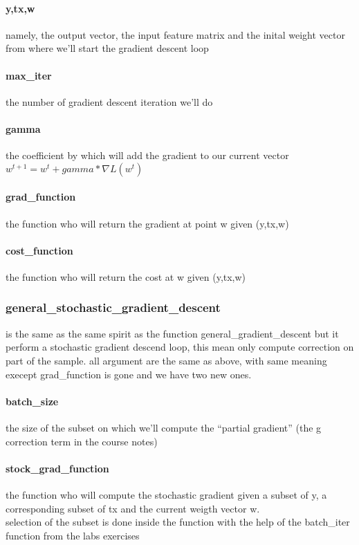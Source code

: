 \documentclass[10pt,conference,compsocconf]{IEEEtran}
\begin{document}
\paragraph{y,tx,w} namely, the output vector, the input feature matrix and
the inital weight vector from where we'll start the gradient descent
loop
\paragraph{max\_iter} the number of gradient descent iteration we'll do
\paragraph{gamma} the coefficient by which will add the gradient to our current
vector \(w^{t+1}=w^{t}+gamma*\nabla L(w^{t})\)
\paragraph{grad\_function} the function who will return the gradient at point
w given (y,tx,w)
\paragraph{cost\_function} the function who will return the cost at w given
(y,tx,w)


\subsubsection{general\_stochastic\_gradient\_descent}
is the same as the same spirit as the function general\_gradient\_descent
but it perform a stochastic gradient descend loop, this mean only compute correction on part of the sample. all argument are the same as above, with same meaning execept grad\_function is gone and we have two new ones.

\paragraph{batch\_size} the size of the subset on which we'll compute the
``partial gradient'' (the g correction term in the course notes)
\paragraph{stock\_grad\_function} the function who will compute the stochastic
gradient given a subset of y, a corresponding subset of tx and the
current weigth vector w.
\\selection of the subset is done inside the function with
the help of the batch\_iter function from the labs exercises
\end{document}
